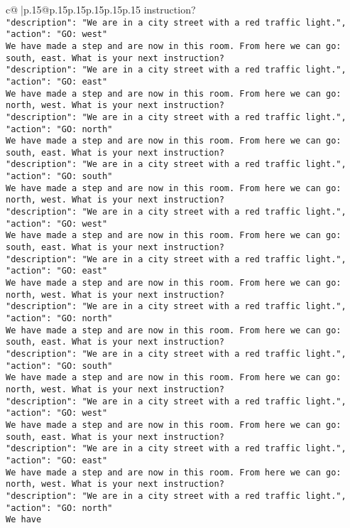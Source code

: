 \documentclass{article}
\begin{document}
{\begin{supertabular}{c@{$\;$}|p{.15\linewidth}@{}p{.15\linewidth}p{.15\linewidth}p{.15\linewidth}p{.15\linewidth}p{.15\linewidth}}
{{{instruction?\\ \tt {"description": "We are in a city street with a red traffic light.", "action": "GO: west"}\\ \tt We have made a step and are now in this room. From here we can go: south, east. What is your next instruction?\\ \tt {"description": "We are in a city street with a red traffic light.", "action": "GO: east"}\\ \tt We have made a step and are now in this room. From here we can go: north, west. What is your next instruction?\\ \tt {"description": "We are in a city street with a red traffic light.", "action": "GO: north"}\\ \tt We have made a step and are now in this room. From here we can go: south, east. What is your next instruction?\\ \tt {"description": "We are in a city street with a red traffic light.", "action": "GO: south"}\\ \tt We have made a step and are now in this room. From here we can go: north, west. What is your next instruction?\\ \tt {"description": "We are in a city street with a red traffic light.", "action": "GO: west"}\\ \tt We have made a step and are now in this room. From here we can go: south, east. What is your next instruction?\\ \tt {"description": "We are in a city street with a red traffic light.", "action": "GO: east"}\\ \tt We have made a step and are now in this room. From here we can go: north, west. What is your next instruction?\\ \tt {"description": "We are in a city street with a red traffic light.", "action": "GO: north"}\\ \tt We have made a step and are now in this room. From here we can go: south, east. What is your next instruction?\\ \tt {"description": "We are in a city street with a red traffic light.", "action": "GO: south"}\\ \tt We have made a step and are now in this room. From here we can go: north, west. What is your next instruction?\\ \tt {"description": "We are in a city street with a red traffic light.", "action": "GO: west"}\\ \tt We have made a step and are now in this room. From here we can go: south, east. What is your next instruction?\\ \tt {"description": "We are in a city street with a red traffic light.", "action": "GO: east"}\\ \tt We have made a step and are now in this room. From here we can go: north, west. What is your next instruction?\\ \tt {"description": "We are in a city street with a red traffic light.", "action": "GO: north"}\\ \tt We have }}}
\end{supertabular}}
\end{document}
